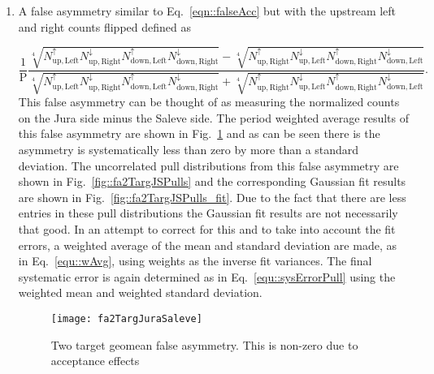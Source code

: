 \begin{enumerate}
  \label{tab::additionalFA}

\item A false asymmetry similar to Eq.~\ref{eqn::falseAcc} but with the upstream
  left and right counts flipped defined as
  
  \begin{equation}
    \label{eqn::additionalfalseAsym}
    \frac{1}{\mathrm{P}}
    \frac{
      \sqrt[4]{
        N_{\mathrm{up,Left}}^{\uparrow}N_{\mathrm{up,Right}}^{\downarrow}
        N_{\mathrm{down,Left}}^{\uparrow}N_{\mathrm{down,Right}}^{\downarrow}
      } -
      \sqrt[4]{
        N_{\mathrm{up,Right}}^{\uparrow}N_{\mathrm{up,Left}}^{\downarrow}
        N_{\mathrm{down,Right}}^{\uparrow}N_{\mathrm{down, Left}}^{\downarrow}
      }
    }{
      \sqrt[4]{
        N_{\mathrm{up,Left}}^{\uparrow}N_{\mathrm{up,Right}}^{\downarrow}
        N_{\mathrm{down,Left}}^{\uparrow}N_{\mathrm{down, Right}}^{\downarrow}
      } +
      \sqrt[4]{
        N_{\mathrm{up,Right}}^{\uparrow}N_{\mathrm{up,Left}}^{\downarrow}
        N_{\mathrm{down,Right}}^{\uparrow}N_{\mathrm{down, Left}}^{\downarrow}
      }
    }.
  \end{equation}
  This false asymmetry can be thought of as measuring the normalized counts on
  the Jura side minus the Saleve side.  The period weighted average results of
  this false asymmetry are shown in Fig.~\ref{fig::fa2TargJuraSaleve} and as can
  be seen there is the asymmetry is systematically less than zero by more than a
  standard deviation.  The uncorrelated pull distributions from this false
  asymmetry are shown in Fig.~\ref{fig::fa2TargJSPulls} and the corresponding
  Gaussian fit results are shown in Fig.~\ref{fig::fa2TargJSPulls_fit}.  Due to
  the fact that there are less entries in these pull distributions the Gaussian
  fit results are not necessarily that good.  In an attempt to correct for this
  and to take into account the fit errors, a weighted average of the mean and
  standard deviation are made, as in Eq.~\ref{equ::wAvg}, using weights as the
  inverse fit variances.  The final systematic error is again determined as in
  Eq.~\ref{equ::sysErrorPull} using the weighted mean and weighted standard
  deviation.

  \begin{figure}[h!t]
    \centering
    \texttt{[image: fa2TargJuraSaleve]}
    \caption{Two target geomean false asymmetry.  This is non-zero due to
      acceptance effects}
    \label{fig::fa2TargJuraSaleve}
  \end{figure}
  

\end{enumerate}
